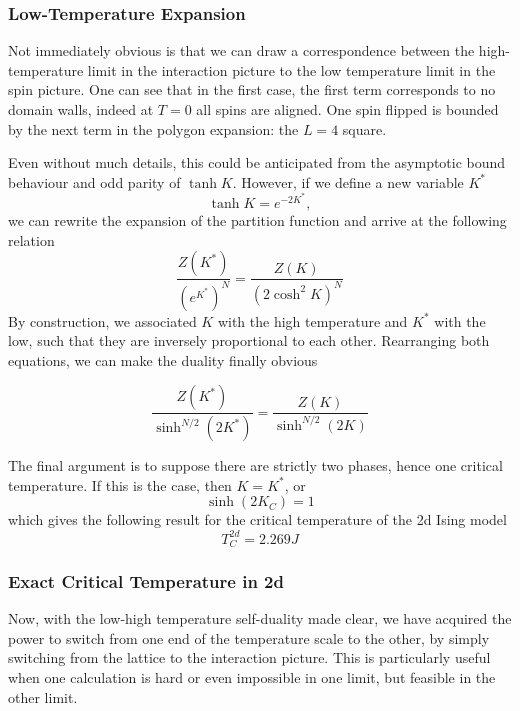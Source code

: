 \subsubsection{Low-Temperature Expansion}
Not immediately obvious is that we can draw a correspondence between the
high-temperature limit in the interaction picture to the low temperature limit
in the spin picture. One can see that in the first case, the first term
corresponds
to no domain walls, indeed at $T=0$ all spins are aligned. One spin flipped is
bounded by the next term in the polygon expansion: the $L=4$ square.
\par Even without much details, this could be anticipated from the asymptotic
bound behaviour and odd parity of $\tanh K$. However, if we define a new 
variable $K^*$
\begin{equation}
  \tanh K = e^{-2K^*},
\end{equation}
we can rewrite the expansion of the partition function and arrive at the 
following relation
\begin{equation}
  \frac{Z(K^*)}{(e^{K^*})^N} = \frac{Z(K)}{(2\cosh^2 K)^N}
\end{equation}
By construction, we associated $K$ with the high temperature and $K^*$ with 
the low, such that they are inversely proportional to each other. Rearranging
both equations, we can make the duality finally obvious
\begin{tcolorbox}[title=Kramers-Wannier duality]
  \begin{equation}
    \frac{Z(K^*)}{\sinh^{N/2}(2K^*)} = \frac{Z(K)}{\sinh^{N/2}(2K)}
  \end{equation}
\end{tcolorbox}
The final argument is to suppose there are strictly two phases, hence one
critical temperature. If this is the case, then $K=K^*$, or
\begin{equation}
  \sinh(2K_C) = 1
\end{equation}
which gives the following result for the critical temperature of the 2d Ising
model
\begin{equation}
  T_C^{2d} = 2.269J
\end{equation}
\subsubsection{Exact Critical Temperature in 2d}
Now, with the low-high temperature self-duality made clear, we have acquired
the power to switch from one end of the temperature scale to the other, by
simply switching from the lattice to the interaction picture. This is
particularly useful when one calculation is hard or even impossible in one
limit, but feasible in the other limit.
